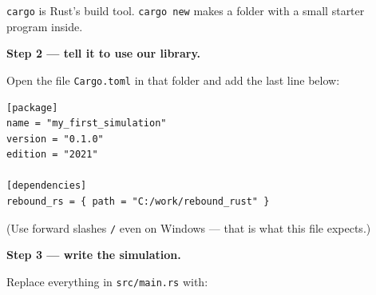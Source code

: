 \documentclass[11pt]{article}
\begin{document}
\texttt{cargo} is Rust's build tool. \texttt{cargo new} makes a folder with a small starter program inside.

\textbf{Step 2 --- tell it to use our library.}

Open the file \texttt{Cargo.toml} in that folder and add the last line below:

\begin{lstlisting}
[package]
name = "my_first_simulation"
version = "0.1.0"
edition = "2021"

[dependencies]
rebound_rs = { path = "C:/work/rebound_rust" }
\end{lstlisting}

(Use forward slashes \texttt{/} even on Windows --- that is what this file expects.)

\textbf{Step 3 --- write the simulation.}

Replace everything in \texttt{src/main.rs} with:
\end{document}
